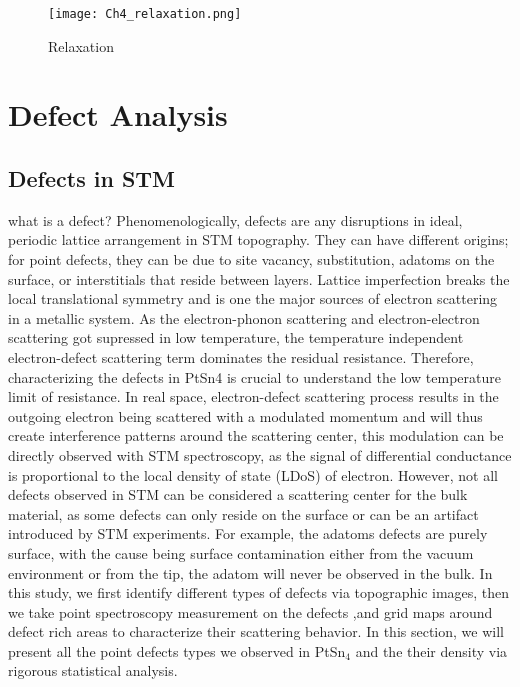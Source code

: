\begin{figure}
	\centering
	\texttt{[image: Ch4\_relaxation.png]}
	\caption{Relaxation}
	\label{fig:ch4_relaxation}
\end{figure}



\section{Defect Analysis}

\subsection{Defects in STM}
what is a defect?
Phenomenologically, defects are any disruptions in ideal, periodic lattice arrangement in STM topography. They can have different origins; for point defects, they can be due to site vacancy, substitution, adatoms on the surface, or interstitials that reside between layers.
Lattice imperfection breaks the local translational symmetry and is one the major sources of electron scattering in a metallic system. As the electron-phonon scattering and electron-electron scattering got supressed in low temperature, the temperature independent electron-defect scattering term dominates the residual resistance. Therefore, characterizing the defects in PtSn4 is crucial to understand the low temperature limit of resistance. In real space, electron-defect scattering process results in the outgoing electron being scattered with a modulated momentum and will thus create interference patterns around the scattering center, this modulation can be directly observed with STM spectroscopy, as the signal of differential conductance is proportional to the local density of state (LDoS) of electron. 
However, not all defects observed in STM can be considered a scattering center for the bulk material, as some defects can only reside on the surface or can be an artifact introduced by STM experiments.  For example, the adatoms defects are purely surface, with the cause being surface contamination either from the vacuum environment or from the tip, the adatom will never be observed in the bulk. 
In this study, we first identify different types of defects via topographic images, then we take point spectroscopy measurement on the defects ,and grid maps around defect rich areas to characterize their scattering behavior. In this section, we will present all the point defects types we observed in PtSn$_4$ and the their density via rigorous statistical analysis. 

